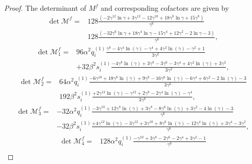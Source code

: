 \documentclass[11pt,letterpaper]{amsart}
\newcommand{\mM}{\mathcal{M}}
\theoremstyle{definition}
\theoremstyle{remark}
\numberwithin{equation}{section}
\begin{document}
\begin{proof}
The determinant of $M^f$ and corresponding cofactors are given by
\begin{equation}\label{determinant-of-M-e}
\begin{split}
\det \mM^f=& 128\frac{(-2\gamma^{12} \ln\gamma + 3\gamma^{12} - 12\gamma^{10} + 18\gamma^8 \ln\gamma + 15\gamma^8 )}{\gamma^6}\\
&128\frac{(- 32\gamma^6 \ln\gamma + 18\gamma^4 \ln\gamma - 15\gamma^4 + 12\gamma^2 - 2\ln\gamma - 3)}{\gamma^6},
\end{split}
\end{equation}
\begin{equation}
    \begin{split}
        \det \mM^f_1=&96\alpha^{2}q^{(1)}_i\frac{\gamma^{6} - 4\gamma^{4}\ln(\gamma) - \gamma^{4} + 4\gamma^{2}\ln(\gamma) - \gamma^{2} + 1}{3\gamma^2}\\
       &+ 32\beta^{2}s^{(1)}_i\frac{- 4\gamma^{8}\ln(\gamma) + 3\gamma^{8} - 3\gamma^{6} - 3\gamma^{4} + 4\gamma^{2}\ln(\gamma) + 3\gamma^{2}}{3\gamma^{2}},
    \end{split}
\end{equation}
\begin{equation}
    \begin{split}
       \det \mM^f_2=& 64\alpha^{2}q^{(1)}_i\frac{-6\gamma^{10} + 18\gamma^{8}\ln(\gamma) + 9\gamma^{8} - 16\gamma^{6}\ln(\gamma) - 6\gamma^{4} + 6\gamma^{2} - 2\ln(\gamma) - 3}{3\gamma^6}\\
       &192\beta^{2}s^{(1)}_i\frac{+ 2\gamma^{12}\ln(\gamma) - \gamma^{12} + 2\gamma^{8} - 2\gamma^{4}\ln(\gamma) - \gamma^{4}}{3\gamma^{6}},
    \end{split}
\end{equation}
\begin{equation}
    \begin{split}
  \det \mM^f_3=&-32\alpha^{2}q^{(1)}_i\frac{-3\gamma^{10} + 12\gamma^{8}\ln(\gamma) + 3\gamma^{8} - 8\gamma^{6}\ln(\gamma) + 3\gamma^{2} - 4\ln(\gamma) - 3}{\gamma^6}\\
  &-32\beta^{2}s^{(1)}_i\frac{+ 4\gamma^{12}\ln(\gamma) - 3\gamma^{12} + 3\gamma^{10} + 8\gamma^{6}\ln(\gamma) - 12\gamma^{4}\ln(\gamma) + 3\gamma^{4} - 3\gamma^{2}}{\gamma^{6}},      
    \end{split}
\end{equation}
\begin{equation}
    \begin{split}
        \det \mM^f_4=&128\alpha^{2}q^{(1)}_i\frac{-\gamma^{10} + 3\gamma^{8} - 2\gamma^{6} - 2\gamma^{4} + 3\gamma^{2} - 1}{\gamma^6}\\

\end{split}
\end{equation}
\end{proof}
\end{document}
